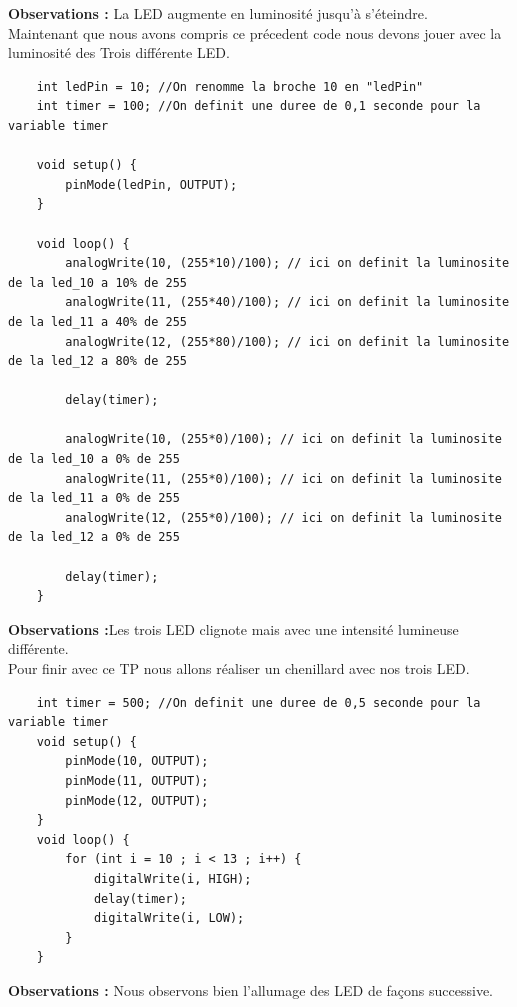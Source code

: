 \textbf{Observations :} La LED augmente en luminosité jusqu’à s'éteindre.\\
Maintenant que nous avons compris ce précedent code nous devons jouer avec la luminosité des Trois différente LED.
\begin{lstlisting}					
	int ledPin = 10; //On renomme la broche 10 en "ledPin"
	int timer = 100; //On definit une duree de 0,1 seconde pour la variable timer
	
	void setup() {
		pinMode(ledPin, OUTPUT);
	}
	
	void loop() {
		analogWrite(10, (255*10)/100); // ici on definit la luminosite de la led_10 a 10% de 255
		analogWrite(11, (255*40)/100); // ici on definit la luminosite de la led_11 a 40% de 255
		analogWrite(12, (255*80)/100); // ici on definit la luminosite de la led_12 a 80% de 255
		
		delay(timer);
		
		analogWrite(10, (255*0)/100); // ici on definit la luminosite de la led_10 a 0% de 255
		analogWrite(11, (255*0)/100); // ici on definit la luminosite de la led_11 a 0% de 255
		analogWrite(12, (255*0)/100); // ici on definit la luminosite de la led_12 a 0% de 255		
		
		delay(timer);		
	}
\end{lstlisting}
\textbf{Observations :}Les trois LED clignote mais avec une intensité lumineuse différente.\\
Pour finir avec ce TP nous allons réaliser un chenillard avec nos trois LED. 
\begin{lstlisting}						
	int timer = 500; //On definit une duree de 0,5 seconde pour la variable timer	
	void setup() {
		pinMode(10, OUTPUT);
		pinMode(11, OUTPUT);
		pinMode(12, OUTPUT);
	}	
	void loop() {		
		for (int i = 10 ; i < 13 ; i++) {			
			digitalWrite(i, HIGH);
			delay(timer);
			digitalWrite(i, LOW);			
		}		
	}
\end{lstlisting} 
\textbf{Observations :} Nous observons bien l'allumage des LED de façons successive.